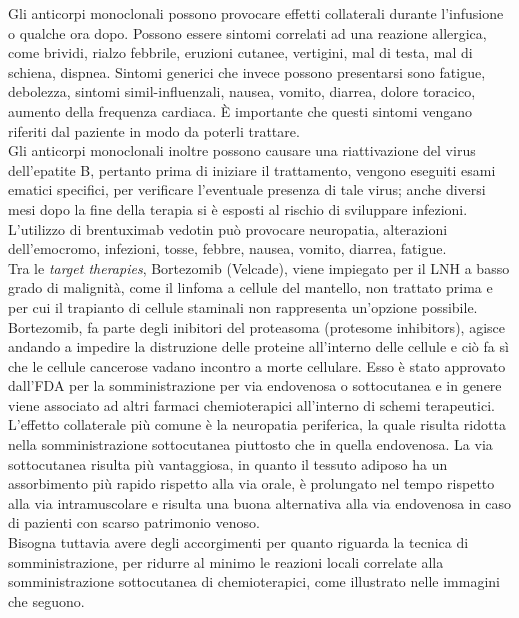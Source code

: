 Gli anticorpi monoclonali possono provocare effetti collaterali durante l’infusione o qualche ora dopo. 
Possono essere sintomi correlati ad una reazione allergica, come brividi, 
rialzo febbrile, eruzioni cutanee, vertigini, mal di testa, mal di schiena, dispnea. 
Sintomi generici che invece possono presentarsi sono fatigue, debolezza, sintomi simil-influenzali, nausea, vomito, 
diarrea, dolore toracico, aumento della frequenza cardiaca\cite{LLSIMMUNO}.
È importante che questi sintomi vengano riferiti dal paziente in modo da poterli trattare.\\		
Gli anticorpi monoclonali inoltre possono causare una riattivazione del virus dell’epatite B, pertanto prima di iniziare 
il trattamento, vengono eseguiti esami ematici specifici, 
per verificare l’eventuale presenza di tale virus; anche diversi mesi dopo la fine della terapia
si è esposti al rischio di sviluppare infezioni. 
L’utilizzo di brentuximab vedotin può provocare neuropatia, alterazioni  dell’emocromo, infezioni, tosse, febbre, 
nausea, vomito, diarrea, fatigue\cite{IMMUNOTP}.\\

Tra le \emph{target therapies}, Bortezomib (Velcade), viene impiegato per il LNH a basso grado di malignità, 
come il linfoma a cellule del mantello, non trattato prima e per cui il trapianto di cellule staminali 
non rappresenta un'opzione possibile.\\
Bortezomib, fa parte degli inibitori del proteasoma (protesome inhibitors), agisce andando a impedire la distruzione 
delle proteine all’interno delle cellule e ciò fa sì che le cellule cancerose vadano incontro a 
morte cellulare\cite{LOWGRADE}.
Esso è stato approvato dall’FDA per la somministrazione per via endovenosa o sottocutanea e in genere viene associato 
ad altri farmaci chemioterapici all’interno di schemi terapeutici.\\ 
L’effetto collaterale più comune è la neuropatia periferica, 
la quale risulta ridotta nella somministrazione sottocutanea piuttosto che in quella endovenosa. 
La via sottocutanea risulta più vantaggiosa, in quanto il tessuto adiposo ha un assorbimento più rapido rispetto 
alla via orale, è prolungato nel tempo rispetto alla via intramuscolare e 
risulta una buona alternativa alla via endovenosa in caso di pazienti con scarso patrimonio venoso\cite{BORTEZOMIB}.\\
Bisogna tuttavia avere degli accorgimenti per quanto riguarda la tecnica di somministrazione, per ridurre al minimo 
le reazioni locali correlate alla somministrazione sottocutanea di chemioterapici, 
come illustrato nelle immagini che seguono.

